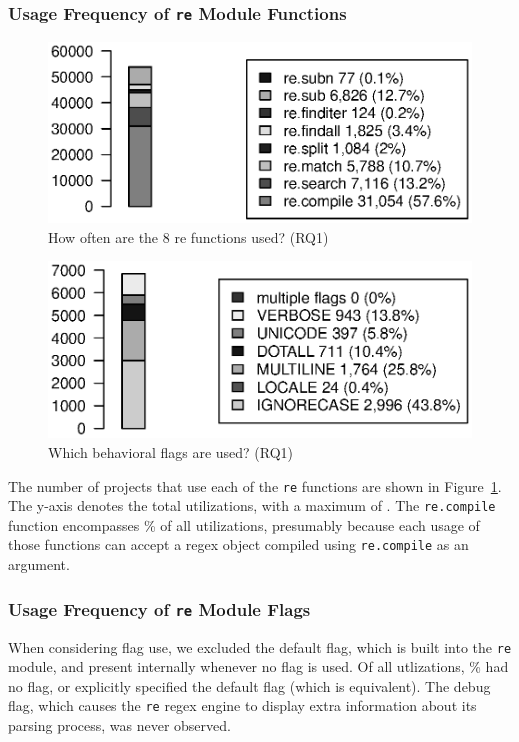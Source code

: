 

\subsubsection{Usage Frequency of {\tt re} Module Functions}

\begin{figure}[tb]
\centering
\includegraphics[width=\columnwidth]{../analysis_output/partFunctions.eps}
\caption{How often are the 8 re functions used? (RQ1)}
\label{fig:partFunctions}
\end{figure}

\begin{figure}[tb]
\centering
\includegraphics[width=\columnwidth]{../analysis_output/partFlags.eps}
\caption{Which behavioral flags are used? (RQ1)}
\label{fig:partFlags}
\end{figure}

The number of projects that use each of the {\tt re} functions are shown in Figure~\ref{fig:partFunctions}.  The y-axis denotes the total utilizations, with a maximum of . The {\tt re.compile} function encompasses \% of all utilizations, presumably because each usage of those functions can accept a regex object compiled using {\tt re.compile} as an argument.

\subsubsection{Usage Frequency of {\tt re} Module Flags}
When considering flag use, we excluded the default flag, which is built into the {\tt re} module, and present internally whenever no flag is used.  Of all utlizations, \% had no flag, or explicitly specified the default flag (which is equivalent).  The debug flag, which causes the {\tt re} regex engine to display extra information about its parsing process, was never observed. 

